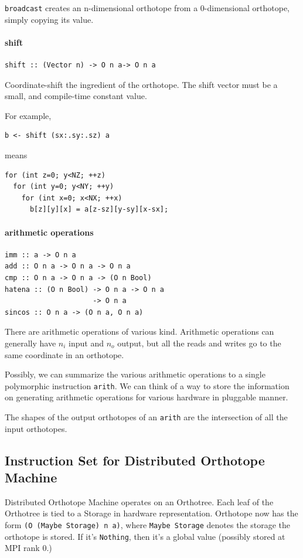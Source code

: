 \documentclass[twocolumn]{article}
\begin{document}
{\tt broadcast} creates an n-dimensional orthotope from a 0-dimensional
orthotope, simply copying its value.

\paragraph{shift}
\begin{verbatim}
shift :: (Vector n) -> O n a-> O n a
\end{verbatim}
Coordinate-shift the ingredient of the orthotope.  The shift vector must be a
small, and compile-time constant value.

For example, 
\begin{verbatim}
b <- shift (sx:.sy:.sz) a
\end{verbatim}
means
\begin{verbatim}
for (int z=0; y<NZ; ++z) 
  for (int y=0; y<NY; ++y) 
    for (int x=0; x<NX; ++x) 
      b[z][y][x] = a[z-sz][y-sy][x-sx];
\end{verbatim}

\paragraph{arithmetic operations}
\begin{verbatim}
imm :: a -> O n a
add :: O n a -> O n a -> O n a
cmp :: O n a -> O n a -> (O n Bool)
hatena :: (O n Bool) -> O n a -> O n a
                     -> O n a
sincos :: O n a -> (O n a, O n a)
\end{verbatim}
There are arithmetic operations of various kind. Arithmetic operations can
generally have $n_i$ input and $n_o$ output, but all the reads and writes go
to the same coordinate in an orthotope. 

Possibly, we can summarize the various arithmetic operations to a single
polymorphic instruction {\tt arith}. We can think of a way to store the
information on generating arithmetic operations for various hardware in
pluggable manner.

The shapes of the output orthotopes of an {\tt arith} are the intersection
of all the input orthotopes.


\subsection{Instruction Set for Distributed Orthotope Machine}
Distributed Orthotope Machine operates on an Orthotree. Each leaf of the
Orthotree is tied to a Storage in hardware representation. Orthotope now has
the form {\tt (O (Maybe Storage) n a)}, where {\tt Maybe Storage} denotes the
storage the orthotope is stored. If it's {\tt Nothing}, then it's a global value
(possibly stored at MPI rank 0.)
\end{document}
